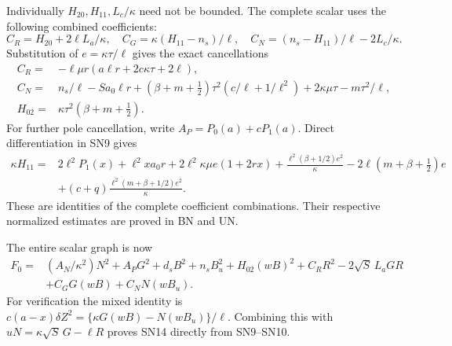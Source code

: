 Individually $H_{20},H_{11},L_c/\kappa$ need not be bounded.
The complete scalar uses the following combined coefficients:
\[
 C_R=H_{20}+2\ell L_a/\kappa,\quad
 C_G=\kappa(H_{11}-n_s)/\ell,\quad
 C_N=(n_s-H_{11})/\ell-2L_c/\kappa.
 \tag{SN11}
\]
Substitution of $e=\kappa\tau/\ell$ gives the exact cancellations
\[
\begin{split}
 C_R={}&-\ell\mu r(a\ell r+2c\kappa\tau+2\ell),\\
 C_N={}&n_s/\ell-Sa_0\ell r
       +(\beta+m+\tfrac12)\tau^2(c/\ell+1/\ell^2)
                   +2\kappa\mu\tau-m\tau^2/\ell,\\
 H_{02}={}&\kappa\tau^2(\beta+m+\tfrac12).
\end{split}\tag{SN12}
\]
For further pole cancellation, write
$A_P=P_0(a)+cP_1(a)$. Direct differentiation in SN9 gives
\[
\begin{split}
 \kappa H_{11}={}&2\ell^2P_1(x)+\ell^2x a_0r
 +2\ell^2\kappa\mu e(1+2rx)
 +\frac{\ell^2(\beta+1/2)e^2}{\kappa}
 -2\ell(m+\beta+\tfrac12)e\\
 &+(c+q)\frac{\ell^2(m+\beta+1/2)e^2}{\kappa}.
\end{split}\tag{SN13}
\]
These are identities of the complete coefficient combinations.
Their respective normalized estimates are proved in BN and UN.

The entire scalar graph is now
\[
\begin{split}
 F_0={}&(A_N/\kappa^2)N^2+A_PG^2+d_sB^2+n_sB_u^2
       +H_{02}(wB)^2+C_RR^2-2\sqrt S\,L_aGR\\
 &+C_GG(wB)+C_NN(wB_u).
\end{split}\tag{SN14}
\]
For verification the mixed identity is
$c(a-x)\delta Z^2=\{\kappa G(wB)-N(wB_u)\}/\ell$.
Combining this with $uN=\kappa\sqrt S\,G-\ell R$ proves
SN14 directly from SN9--SN10.

